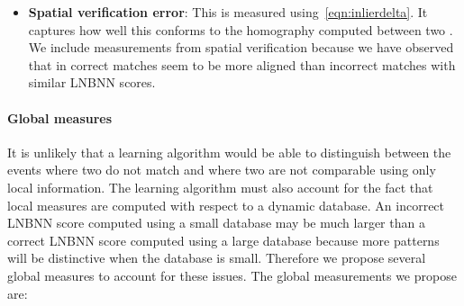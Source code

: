 \begin{itemize}
                \item \textbf{Spatial verification error}:
                    This is measured using~\cref{eqn:inlierdelta}.
                    It captures how well this \correspondence{} conforms to
                      the homography computed between two \annots{}.
                    We include measurements from spatial verification because
                      we have observed that \correspondences{} in correct
                      matches seem to be more aligned than incorrect matches
                      with similar LNBNN scores.

            \end{itemize}

            \paragraph{Global measures}
            It is unlikely that a learning algorithm would be able to
              distinguish between the events where two \annots{} do not match
              and where two \annots{} are not comparable using only local
              information.
            The learning algorithm must also account for the fact that local
              measures are computed with respect to a dynamic database.
            An incorrect LNBNN score computed using a small database may be
              much larger than a correct LNBNN score computed using a large
              database because more patterns will be distinctive when the
              database is small.
            Therefore we propose several global measures to account for these
              issues.
            The global measurements we propose are:
